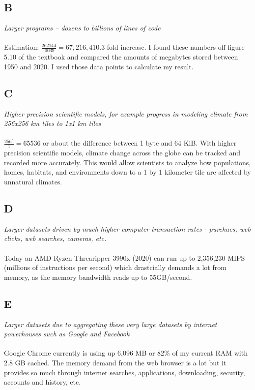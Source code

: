 \documentclass[10pt]{article}
\begin{document}
\subsection{B}
\textit{Larger programs – dozens to billions of lines of code}
\paragraph{} Estimation: $\frac{262144}{.0039} = 67,216,410.3$ fold increase. I found these numbers off figure 5.10 of the textbook and compared the amounts of megabytes stored between 
1950 and 2020. I used those data points to calculate my result. 
\subsection{C}
\textit{Higher precision scientific models, for example progress in modeling climate from
256x256 km tiles to 1x1 km tiles}
\paragraph{} $\frac{256^2}{1} = 65 536$ or about the difference between 1 byte and 64 KiB. With higher precision scientific models, climate change across the globe can be tracked and recorded 
more accurately. This would allow scientists to analyze how populations, homes, habitats, and environments down to a 1 by 1 kilometer tile are affected by unnatural climates. 
\subsection{D}
\textit{Larger datasets driven by much higher computer transaction rates - purchaes, web
clicks, web searches, cameras, etc.}
\paragraph{} Today an AMD Ryzen Threaripper 3990x (2020) can run up to 2,356,230 MIPS (millions of instructions per second) which drastcially demands a lot from memory, as the memory bandwidth reads up to
55GB/second.
\subsection{E}
\textit{Larger datasets due to aggregating these very large datasets by internet powerhouses
such as Google and Facebook}
\paragraph{} Google Chrome currently is using up 6,096 MB or 82\% of my current RAM with 2.8 GB cached. The memory demand from the web browser is a lot but it provides so much through 
internet searches, applications, downloading, security, accounts and history, etc.   
\end{document}
